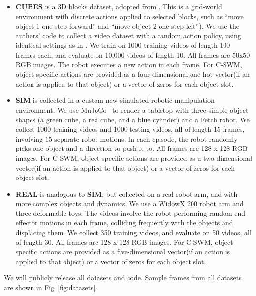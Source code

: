 \documentclass{article}
\begin{document}
\begin{itemize}[leftmargin=*]
    \item \textbf{CUBES} is a 3D blocks dataset, adopted from \citet{kipf2019contrastive}. This is a grid-world environment with discrete actions applied to selected blocks, such as ``move object 1 one step forward'' and ``move object 2 one step left''). We use the authors' code to collect a video dataset with a random action policy, using identical settings as in \citet{kipf2019contrastive}. We train on 1000 training videos of length 100 frames each, and evaluate on 10,000 videos of length 10. All frames are 50x50 RGB images. The robot executes a new action in each frame. For C-SWM, object-specific actions are provided as a four-dimensional one-hot vector(if an action is applied to that object) or a vector of zeros for each object slot.
    \item \textbf{SIM} is collected in a custom new simulated robotic manipulation environment. We use MuJoCo~\cite{todorov2012mujoco} to render a tabletop with three simple object shapes (a green cube, a red cube, and a blue cylinder) and a Fetch robot. We collect 1000 training videos and 1000 testing videos, all of length 15 frames, involving 15 separate robot motions. In each episode, the robot randomly picks one object and a direction to push it to.  All frames are 128 x 128 RGB images. For C-SWM, object-specific actions are provided as a two-dimensional vector(if an action is applied to that object) or a vector of zeros for each object slot.
    \item \textbf{REAL} is analogous to \textbf{SIM}, but collected on a real robot arm, and with more complex objects and dynamics. We use a WidowX 200 robot arm and three deformable toys. The videos involve the robot performing random end-effector motions in each frame, colliding frequently with the objects and displacing them. We collect 350 training videos, and evaluate on 50 videos, all of length 30. All frames are 128 x 128 RGB images. For C-SWM, object-specific actions are provided as a five-dimensional vector(if an action is applied to that object) or a vector of zeros for each object slot.
\end{itemize}

We will publicly release all datasets and code. Sample frames from all datasets are shown in Fig~\ref{fig:datasets}.

\end{document}

